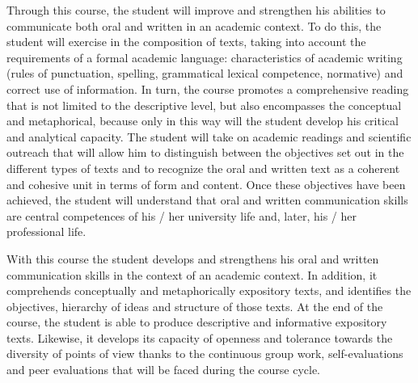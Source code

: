 \begin{syllabus}


\begin{justification}
Through this course, the student will improve and strengthen his abilities to communicate both oral and written in an academic context. To do this, the student will exercise in the composition of texts, taking into account the requirements of a formal academic language: characteristics of academic writing (rules of punctuation, spelling, grammatical lexical competence, normative) and correct use of information. In turn, the course promotes a comprehensive reading that is not limited to the descriptive level, but also encompasses the conceptual and metaphorical, because only in this way will the student develop his critical and analytical capacity. The student will take on academic readings and scientific outreach that will allow him to distinguish between the objectives set out in the different types of texts and to recognize the oral and written text as a coherent and cohesive unit in terms of form and content. Once these objectives have been achieved, the student will understand that oral and written 
communication skills are central competences of his / her university life and, later, his / her professional life. 
\end{justification}

\begin{goals}
\item With this course the student develops and strengthens his oral and written communication skills in the context of an academic context. In addition, it comprehends conceptually and metaphorically expository texts, and identifies the objectives, hierarchy of ideas and structure of those texts. At the end of the course, the student is able to produce descriptive and informative expository texts. Likewise, it develops its capacity of openness and tolerance towards the diversity of points of view thanks to the continuous group work, self-evaluations and peer evaluations that will be faced during the course cycle.
\end{goals}

\begin{outcomes}   
    \item {}
    \item {}
    \item {}
    \item {}
\end{outcomes}


\end{syllabus}
